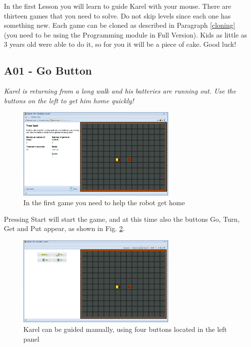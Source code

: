 \documentclass[article,A4,12pt]{llncs}
\begin{document}
In the first Lesson you will learn to guide Karel with your mouse.
There are thirteen games that you need to 
solve. Do not skip levels since each one has something new. Each game can 
be cloned as described in Paragraph \ref{cloning} (you need to be using the 
Programming module in Full Version). 
Kids as little as 3 years old were able to do it, so for you it will be a piece 
of cake. Good luck!

\newpage

\subsection{A01 - Go Button}

{\em Karel is returning from a long walk and his batteries are running out. 
Use the buttons on the left to get him home quickly! }

\begin{figure}[!ht]
\begin{center}
\includegraphics[width=0.7\textwidth]{img/a01.png}
\end{center}
\vspace{-4mm}
\caption{In the first game you need to help the robot get home}
\label{fig:a01}
\end{figure}
\noindent
Pressing Start will start 
the game, and at this time also the buttons Go, Turn, Get and Put appear, 
as shown in Fig. \ref{fig:a01b}.

\begin{figure}[!ht]
\begin{center}
\includegraphics[width=0.7\textwidth]{img/a01b.png}
\end{center}
\vspace{-4mm}
\caption{Karel can be guided manually, using four buttons located in the left panel}
\label{fig:a01b}
\end{figure}
\end{document}
